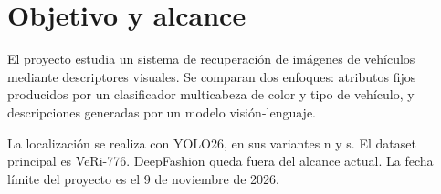 \section{Objetivo y alcance}

El proyecto estudia un sistema de recuperación de imágenes de vehículos mediante
descriptores visuales. Se comparan dos enfoques: atributos fijos producidos por
un clasificador multicabeza de color y tipo de vehículo, y descripciones
generadas por un modelo visión-lenguaje.

La localización se realiza con YOLO26, en sus variantes n y s. El dataset
principal es VeRi-776. DeepFashion queda fuera del alcance actual. La fecha
límite del proyecto es el 9 de noviembre de 2026.
